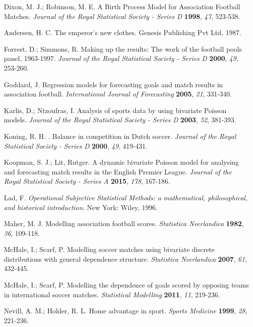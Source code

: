 \documentclass[journal,article,accept,moreauthors,pdftex,12pt,a4paper]{mdpi}
\begin{document}
\begin{thebibliography}{999}
		 Dixon, M. J.; Robinson, M. E. A Birth Process Model for Association Football Matches. {\em Journal of the Royal Statistical Society - Series D}
		{\bf 1998}, {\em 47}, 523-538.
		
		Andersen, H.  C. The emperor's new clothes. Genesis Publishing Pvt Ltd, 1987.
		
		 Forrest, D.; Simmons, R. Making up the results: The work
		of the football pools panel, 1963-1997. {\em Journal of the Royal Statistical Society - Series D} {\bf 2000}, {\em 49}, 253-260.
		
		Goddard, J. Regression models for forecasting goals and match
		results in association football. {\em International Journal of
			Forecasting} {\bf 2005}, {\em 21}, 331-340.
		
		Karlis, D.; Ntzoufras, I. Analysis of sports data by using bivariate
		Poisson models. {\em Journal of the Royal Statistical Society - Series D} {\bf 2003}, {\em 52}, 381-393.
		
		Koning, R. H. . Balance in competition in Dutch soccer. {\em Journal of the Royal Statistical Society - Series D} {\bf 2000}, {\em 49}, 419-431.
		
		Koopman, S. J.; Lit, Rutger. A dynamic bivariate Poisson model for
		analysing and forecasting match results in the English Premier
		League. {\em Journal of the Royal Statistical Society - Series A}
		{\bf 2015}, {\em 178}, 167-186.
		
		Lad, F. {\it Operational Subjective Statistical Methods: a mathematical,
			philosophical, and historical introduction}. New York: Wiley, 1996.
		
		Maher, M. J. Modelling association football scores. {\em Statistica Neerlandica} {\bf 1982}, {\em 36}, 109-118.
		
		McHale, I.; Scarf, P. Modelling soccer matches using bivariate
		discrete distributions with general dependence structure. {\em
			Statistica Neerlandica} {\bf 2007}, {\em 61}, 432-445.
		
		McHale, I.; Scarf, P. Modelling the dependence of goals scored by
		opposing teams in international soccer matches. {\em Statistical
			Modelling} {\bf 2011}, {\em 11}, 219-236.
		
		Nevill, A. M.; Holder, R. L. Home advantage in sport. {\em Sports
			Medicine} {\bf 1999}, {\em 28}, 221-236.
		

\end{thebibliography}
\end{document}
